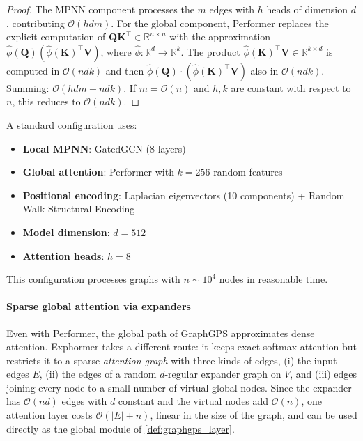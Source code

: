 \begin{proof}
The MPNN component processes the $m$ edges with $h$ heads of dimension $d$, contributing $\mathcal{O}(hdm)$. For the global component, Performer replaces the explicit computation of $\mathbf{Q}\mathbf{K}^\top \in \mathbb{R}^{n \times n}$ with the approximation $\hat{\phi}(\mathbf{Q})(\hat{\phi}(\mathbf{K})^\top \mathbf{V})$, where $\hat{\phi}: \mathbb{R}^d \to \mathbb{R}^k$. The product $\hat{\phi}(\mathbf{K})^\top \mathbf{V} \in \mathbb{R}^{k \times d}$ is computed in $\mathcal{O}(ndk)$ and then $\hat{\phi}(\mathbf{Q}) \cdot (\hat{\phi}(\mathbf{K})^\top \mathbf{V})$ also in $\mathcal{O}(ndk)$. Summing: $\mathcal{O}(hdm + ndk)$. If $m = \mathcal{O}(n)$ and $h, k$ are constant with respect to $n$, this reduces to $\mathcal{O}(ndk)$.
\end{proof}

\begin{example}\label{ex:graphgps_configuration}
A standard configuration uses:
\begin{itemize}
    \item \textbf{Local MPNN}: GatedGCN (8 layers)
    \item \textbf{Global attention}: Performer with $k=256$ random features
    \item \textbf{Positional encoding}: Laplacian eigenvectors (10 components) + Random Walk Structural Encoding
    \item \textbf{Model dimension}: $d=512$
    \item \textbf{Attention heads}: $h=8$
\end{itemize}
This configuration processes graphs with $n \sim 10^4$ nodes in reasonable time.
\end{example}


\paragraph{Sparse global attention via expanders}

Even with Performer, the global path of GraphGPS approximates dense attention. Exphormer \citep{shirzad2023exphormer} takes a different route: it keeps exact softmax attention but restricts it to a sparse \emph{attention graph} with three kinds of edges, (i) the input edges $E$, (ii) the edges of a random $d$-regular expander graph on $V$, and (iii) edges joining every node to a small number of virtual global nodes. Since the expander has $\mathcal{O}(nd)$ edges with $d$ constant and the virtual nodes add $\mathcal{O}(n)$, one attention layer costs $\mathcal{O}(|E| + n)$, linear in the size of the graph, and can be used directly as the global module of \autoref{def:graphgps_layer}.

